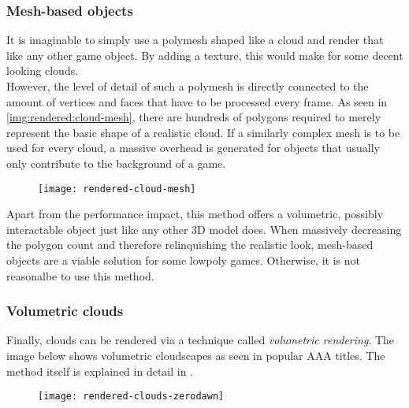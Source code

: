 \subsubsection{Mesh-based objects}
It is imaginable to simply use a \gls{polymesh} shaped like a cloud and render that like any other game object. By adding a texture, this would make for some decent looking clouds.
\\
However, the level of detail of such a polymesh is directly connected to the amount of vertices and faces that have to be processed every frame.
As seen in \autoref{img:rendered:cloud-mesh}, there are hundreds of polygons required to merely represent the basic shape of a realistic cloud.
If a similarly complex mesh is to be used for every cloud, a massive overhead is generated for objects that usually only contribute to the background of a game.
\begin{figure}[H]
    \centering
    \texttt{[image: rendered-cloud-mesh]}
    \label{img:rendered:cloud-mesh}
\end{figure}
\noindent
Apart from the performance impact, this method offers a volumetric, possibly interactable object just like any other 3D model does.
When massively decreasing the polygon count and therefore relinquishing the realistic look, mesh-based objects are a viable solution for some \gls{lowpoly} games.
Otherwise, it is not reasonalbe to use this method.

\subsubsection{Volumetric clouds}
Finally, clouds can be rendered via a technique called \textit{volumetric rendering}. The image below shows volumetric cloudscapes as seen in popular AAA titles.
The method itself is explained in detail in .

\begin{figure}[H]
    \centering
    \texttt{[image: rendered-clouds-zerodawn]}
    \label{img:rendered:clouds-zerodawn}
\end{figure}